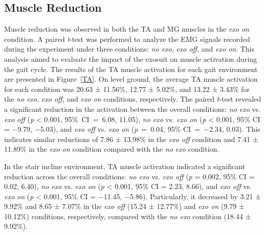 \documentclass[actuators,article,accept,pdftex,moreauthors]{Definitions/mdpi}
\begin{document}
\subsection{Muscle Reduction}
Muscle reduction was observed in both the TA and MG muscles in the \textit{exo on} condition. A paired \emph{t}-test was performed to analyze the EMG signals recorded during the experiment under three conditions: \textit{no exo}, \textit{exo off}, and \textit{exo on}. This analysis aimed to evaluate the impact of the exosuit on muscle activation during the gait cycle.
The results of the TA muscle activation for each gait {environment} are presented in Figure~\ref{TA}. 
On level ground, the average TA muscle activation for each condition was 20.63 ± 11.56\%, 12.77 ± 5.02\%, and 13.22 ± 3.43\% for the \textit{no exo}, \textit{exo off}, and \textit{exo on} conditions, respectively. {The paired \emph{t}-test revealed a significant reduction in the activation between the overall conditions: \textit{no exo} vs. \textit{exo off} (\emph{p} < 0.001, \mbox{95\% CI = 6.08,} 11.05), \textit{no exo} vs. \textit{exo on} (\emph{p} < 0.001, 95\% CI = $-$9.79, $-$5.03), and \textit{exo off} vs. \textit{exo on} \mbox{(\emph{p} = 0.04,} 95\% \mbox{CI = $-$2.34,} 0.03).}  This indicates similar reductions of 7.86 ± 13.98\% in the \textit{exo off} condition and 7.41 ± 11.89\% in the \textit{exo on} condition compared with the \textit{no exo} condition.

 {In the stair incline environment, TA muscle activation indicated a significant reduction across the overall conditions: \textit{no exo} vs. \textit{exo off} (\emph{p} = 0.002, 95\% CI = 0.02, 6.40), \textit{no exo} vs. \textit{exo on} (\emph{p} < 0.001, 95\% CI = 2.23, 8.66), and \textit{exo off} vs. \textit{exo on} (\emph{p} < 0.001, 95\% CI = $-$11.45, $-$5.86).} Particularly, it decreased by 3.21 ± 9.92\% and 8.65 ± 7.07\% in the \textit{exo off} (15.24 ± 12.77\%) and \textit{exo on} (9.79 ± 10.12\%) conditions, respectively, compared with the \textit{no exo} condition (18.44 ± 9.92\%). 
\end{document}
